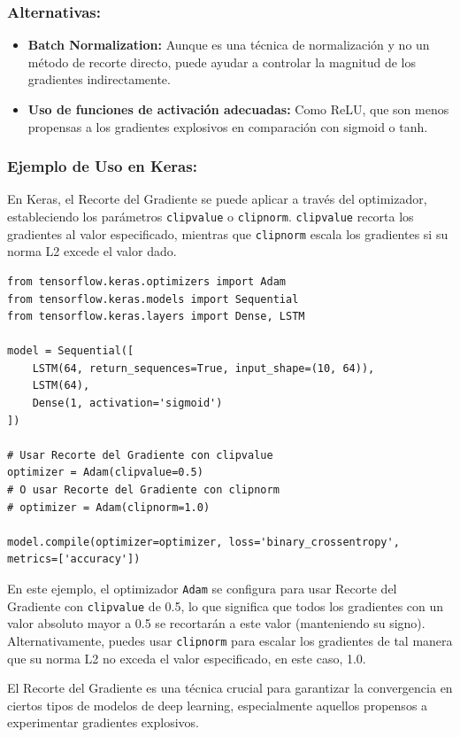 \documentclass[11pt]{article}
\begin{document}
\subsubsection{Alternativas:}
\label{sec:org4e10452}
\begin{itemize}
\item \textbf{Batch Normalization:} Aunque es una técnica de normalización y no un
método de recorte directo, puede ayudar a controlar la magnitud de los
gradientes indirectamente.
\item \textbf{Uso de funciones de activación adecuadas:} Como ReLU, que son menos
propensas a los gradientes explosivos en comparación con sigmoid o
tanh.
\end{itemize}

\subsubsection{Ejemplo de Uso en Keras:}
\label{sec:org354387a}
En Keras, el Recorte del Gradiente se puede aplicar a través del
optimizador, estableciendo los parámetros \texttt{clipvalue} o \texttt{clipnorm}.
\texttt{clipvalue} recorta los gradientes al valor especificado, mientras que
\texttt{clipnorm} escala los gradientes si su norma L2 excede el valor dado.

\begin{verbatim}
from tensorflow.keras.optimizers import Adam
from tensorflow.keras.models import Sequential
from tensorflow.keras.layers import Dense, LSTM

model = Sequential([
    LSTM(64, return_sequences=True, input_shape=(10, 64)),
    LSTM(64),
    Dense(1, activation='sigmoid')
])

# Usar Recorte del Gradiente con clipvalue
optimizer = Adam(clipvalue=0.5)
# O usar Recorte del Gradiente con clipnorm
# optimizer = Adam(clipnorm=1.0)

model.compile(optimizer=optimizer, loss='binary_crossentropy', metrics=['accuracy'])
\end{verbatim}

En este ejemplo, el optimizador \texttt{Adam} se configura para usar Recorte
del Gradiente con \texttt{clipvalue} de 0.5, lo que significa que todos los
gradientes con un valor absoluto mayor a 0.5 se recortarán a este valor
(manteniendo su signo). Alternativamente, puedes usar \texttt{clipnorm} para
escalar los gradientes de tal manera que su norma L2 no exceda el valor
especificado, en este caso, 1.0.

El Recorte del Gradiente es una técnica crucial para garantizar la
convergencia en ciertos tipos de modelos de deep learning, especialmente
aquellos propensos a experimentar gradientes explosivos.
\end{document}
